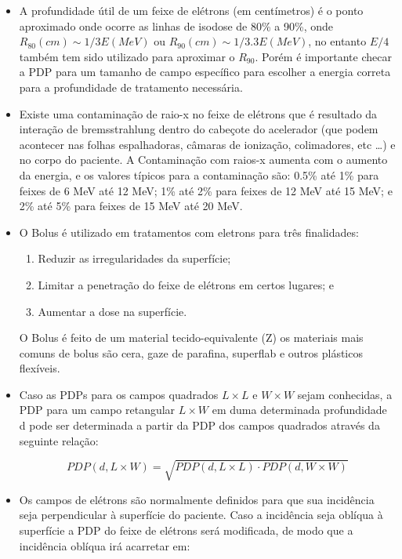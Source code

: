 \documentclass[11pt,a4paper]{article}
\newcounter{exemplo}
\begin{document}
\begin{exemplo}
\begin{itemize}
        \item A profundidade útil de um feixe de elétrons (em centímetros) é o ponto aproximado onde ocorre as linhas de isodose de 80\% a 90\%, onde $R_{80}(cm) \sim 1/3 E(MeV)$ ou $R_{90}(cm) \sim 1/3.3 E(MeV)$, no entanto $E/4$ também tem sido utilizado para aproximar o $R_{90}$. Porém é importante checar a PDP para um tamanho de campo específico para escolher a energia correta para a profundidade de tratamento necessária. 
        
        \item Existe uma contaminação de raio-x no feixe de elétrons que é resultado da interação de bremsstrahlung dentro do cabeçote do acelerador (que podem acontecer nas folhas espalhadoras, câmaras de ionização, colimadores, etc \dots) e no corpo do paciente. A Contaminação com raios-x aumenta com o aumento da energia, e os valores típicos para a contaminação são:  0.5\% até 1\% para feixes de 6 MeV até 12 MeV; 1\% até 2\% para feixes de 12 MeV até 15 MeV; e 2\% até 5\% para feixes de 15 MeV até 20 MeV.
        
        \item O Bolus é utilizado em tratamentos com eletrons para três finalidades:
        
            \begin{enumerate}[label=\roman*.]
                \item Reduzir as irregularidades da superfície;
                \item Limitar a penetração do feixe de elétrons em certos lugares; e
                \item Aumentar a dose na superfície.
            \end{enumerate}
        O Bolus é feito de um material tecido-equivalente (Z) os materiais mais comuns de bolus são cera, gaze de parafina, superflab e outros plásticos flexíveis.

        \item Caso as PDPs para os campos quadrados $L \times L$ e $W \times W$ sejam conhecidas, a PDP para um campo retangular $L \times W$ em duma determinada profundidade d pode ser determinada a partir da PDP dos campos quadrados através da seguinte relação:
        
            $$PDP(d, L \times W) = \sqrt{PDP(d, L \times L) \cdot PDP(d, W \times W)}$$

        \item Os campos de elétrons são normalmente definidos para que sua incidência seja perpendicular à superfície do paciente. Caso a incidência seja oblíqua à superfície a PDP do feixe de elétrons será modificada, de modo que a incidência oblíqua irá acarretar em:
        

\end{itemize}
\end{exemplo}
\end{document}
